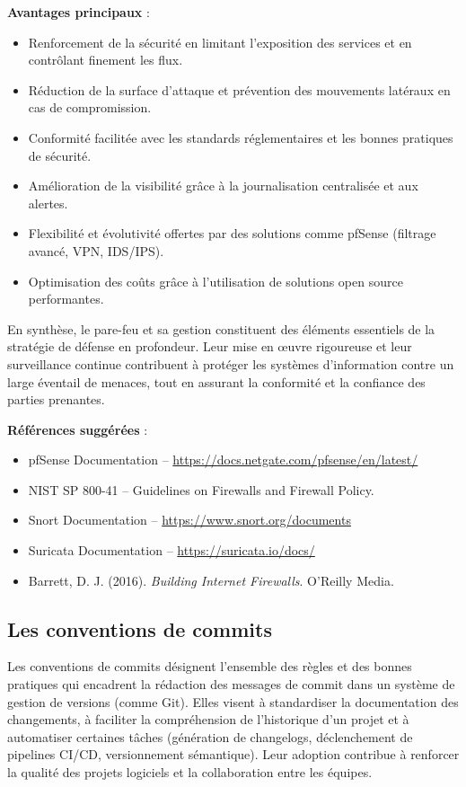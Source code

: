 \textbf{Avantages principaux} :
\begin{itemize}
	\item Renforcement de la sécurité en limitant l’exposition des services et en contrôlant finement les flux.
	\item Réduction de la surface d’attaque et prévention des mouvements latéraux en cas de compromission.
	\item Conformité facilitée avec les standards réglementaires et les bonnes pratiques de sécurité.
	\item Amélioration de la visibilité grâce à la journalisation centralisée et aux alertes.
	\item Flexibilité et évolutivité offertes par des solutions comme pfSense (filtrage avancé, VPN, IDS/IPS).
	\item Optimisation des coûts grâce à l’utilisation de solutions open source performantes.
\end{itemize}

En synthèse, le pare-feu et sa gestion constituent des éléments essentiels de la stratégie de défense en profondeur. Leur mise en œuvre rigoureuse et leur surveillance continue contribuent à protéger les systèmes d’information contre un large éventail de menaces, tout en assurant la conformité et la confiance des parties prenantes.

\textbf{Références suggérées} :
\begin{itemize}
	\item pfSense Documentation – \url{https://docs.netgate.com/pfsense/en/latest/}
	\item NIST SP 800-41 – Guidelines on Firewalls and Firewall Policy.
	\item Snort Documentation – \url{https://www.snort.org/documents}
	\item Suricata Documentation – \url{https://suricata.io/docs/}
	\item Barrett, D. J. (2016). \textit{Building Internet Firewalls}. O’Reilly Media.
\end{itemize}

\subsection{Les conventions de commits}

Les conventions de commits désignent l’ensemble des règles et des bonnes pratiques qui encadrent la rédaction des messages de commit dans un système de gestion de versions (comme Git). Elles visent à standardiser la documentation des changements, à faciliter la compréhension de l’historique d’un projet et à automatiser certaines tâches (génération de changelogs, déclenchement de pipelines CI/CD, versionnement sémantique). Leur adoption contribue à renforcer la qualité des projets logiciels et la collaboration entre les équipes.

